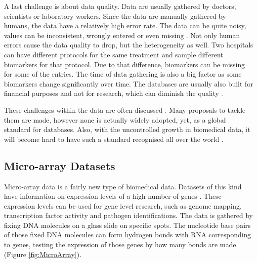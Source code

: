\documentclass[10pt,a4paper]{report}
\begin{document}
	A last challenge is about data quality. Data are usually gathered by doctors, scientists or laboratory workers. Since the data are manually gathered by humans, the data have a relatively high error rate. The data can be quite noisy, values can be inconsistent, wrongly entered or even missing \cite{CIOS20021}. Not only human errors cause the data quality to drop, but the heterogeneity as well. Two hospitals can have different protocols for the same treatment and sample different biomarkers for that protocol. Due to that difference, biomarkers can be missing for some of the entries. The time of data gathering is also a big factor as some biomarkers change significantly over time. The databases are usually also built for financial purposes and not for research, which can diminish the quality \cite{Yoo2012}.
	
	These challenges within the data are often discussed \cite{bellazzi2011data}. Many proposals to tackle them are made, however none is actually widely adopted, yet, as a global standard for databases. Also, with the uncontrolled growth in biomedical data, it will become hard to have such a standard recognised all over the world \cite{Otasek2014, marenco2004qis, bichutskiy2006heterogeneous, sperzel1991biomedical, aubry1988design, Windridge2014}.
	
	\subsection{Micro-array Datasets}
	\label{PLsubsec:Microarray}
	
	Micro-array data is a fairly new type of biomedical data. Datasets of this kind have information on expression levels of a high number of genes \cite{brazma2001minimum}. These expression levels can be used for gene level research, such as genome mapping, transcription factor activity and pathogen identifications. The data is gathered by fixing DNA molecules on a glass slide on specific spots. The nucleotide base pairs of those fixed DNA molecules can form hydrogen bonds with RNA corresponding to genes, testing the expression of those genes by how many bonds are made \cite{selvaraj2011microarray} (Figure \ref{fig:MicroArray}).
	
\end{document}
